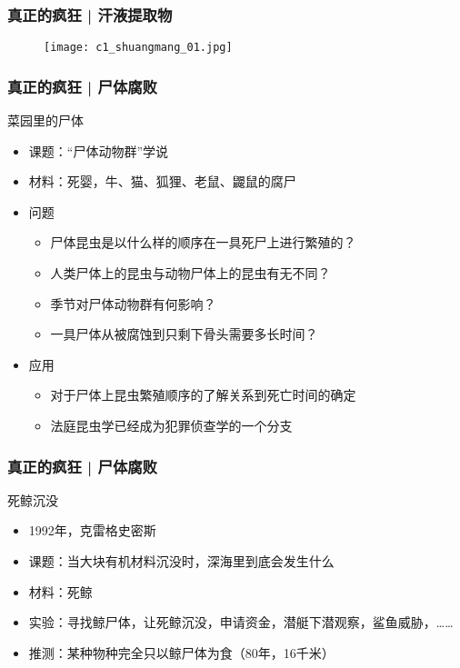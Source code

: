 \begin{frame}
  \frametitle{真正的疯狂 | 汗液提取物}
    \begin{figure}
      \centering
      \texttt{[image: c1\_shuangmang\_01.jpg]}
    \end{figure}
\end{frame}

\begin{frame}
  \frametitle{真正的疯狂 | 尸体腐败}
  \begin{block}{菜园里的尸体}
    \begin{itemize}
      \item 课题：“尸体动物群”学说
      \item 材料：死婴，牛、猫、狐狸、老鼠、鼹鼠的腐尸
      \item 问题
        \begin{itemize}
          \item 尸体昆虫是以什么样的顺序在一具死尸上进行繁殖的？
          \item 人类尸体上的昆虫与动物尸体上的昆虫有无不同？
          \item 季节对尸体动物群有何影响？
          \item 一具尸体从被腐蚀到只剩下骨头需要多长时间？
        \end{itemize}
      \item 应用
        \begin{itemize}
          \item 对于尸体上昆虫繁殖顺序的了解关系到死亡时间的确定
          \item 法庭昆虫学已经成为犯罪侦查学的一个分支
        \end{itemize}
    \end{itemize}
  \end{block}
\end{frame}

\begin{frame}
  \frametitle{真正的疯狂 | 尸体腐败}
  \begin{block}{死鲸沉没}
    \begin{itemize}
      \item 1992年，克雷格\textbullet 史密斯
      \item 课题：当大块有机材料沉没时，深海里到底会发生什么
      \item 材料：死鲸
      \item 实验：寻找鲸尸体，让死鲸沉没，申请资金，潜艇下潜观察，鲨鱼威胁，……
      \item 推测：某种物种完全只以鲸尸体为食（80年，16千米）
    \end{itemize}
  \end{block}
\end{frame}

